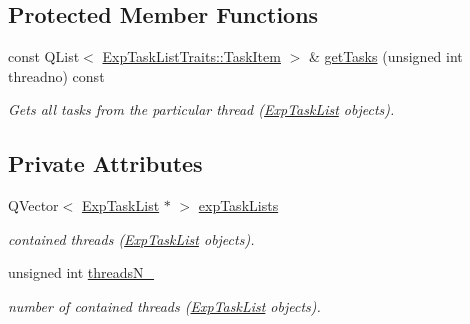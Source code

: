 \subsection*{Protected Member Functions}
\begin{DoxyCompactItemize}
\item 
\hypertarget{class_fork_join_task_a8bb596c1e3ffc59e2302c2d19273da76}{}const Q\+List$<$ \hyperlink{struct_exp_task_list_traits_1_1_task_item}{Exp\+Task\+List\+Traits\+::\+Task\+Item} $>$ \& \hyperlink{class_fork_join_task_a8bb596c1e3ffc59e2302c2d19273da76}{get\+Tasks} (unsigned int threadno) const \label{class_fork_join_task_a8bb596c1e3ffc59e2302c2d19273da76}

\begin{DoxyCompactList}\small\item\em Gets all tasks from the particular thread (\hyperlink{class_exp_task_list}{Exp\+Task\+List} objects). \end{DoxyCompactList}\end{DoxyCompactItemize}
\subsection*{Private Attributes}
\begin{DoxyCompactItemize}
\item 
\hypertarget{class_fork_join_task_a3225694976a00691c7468d4c5126cf74}{}Q\+Vector$<$ \hyperlink{class_exp_task_list}{Exp\+Task\+List} $\ast$ $>$ \hyperlink{class_fork_join_task_a3225694976a00691c7468d4c5126cf74}{exp\+Task\+Lists}\label{class_fork_join_task_a3225694976a00691c7468d4c5126cf74}

\begin{DoxyCompactList}\small\item\em contained threads (\hyperlink{class_exp_task_list}{Exp\+Task\+List} objects). \end{DoxyCompactList}\item 
\hypertarget{class_fork_join_task_ac5051eb583219076a4b6e4157490abf7}{}unsigned int \hyperlink{class_fork_join_task_ac5051eb583219076a4b6e4157490abf7}{threads\+N\+\_\+}\label{class_fork_join_task_ac5051eb583219076a4b6e4157490abf7}

\begin{DoxyCompactList}\small\item\em number of contained threads (\hyperlink{class_exp_task_list}{Exp\+Task\+List} objects). \end{DoxyCompactList}\end{DoxyCompactItemize}
